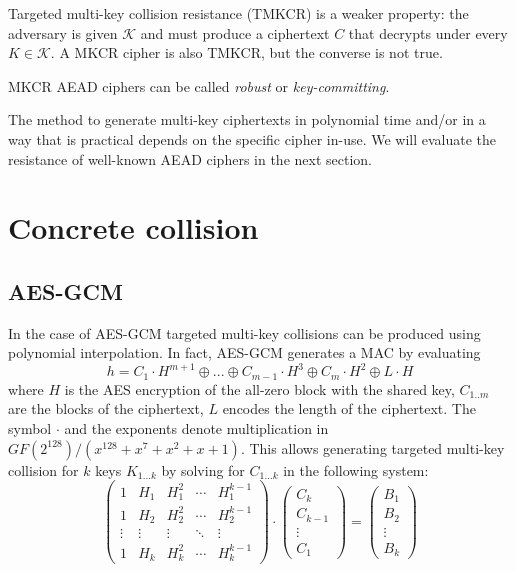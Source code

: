 \documentclass[9pt, a4paper]{article}
\begin{document}
Targeted multi-key collision resistance (TMKCR) is a weaker property: the adversary is given $\mathcal K$ and must produce a ciphertext $C$ that decrypts under every $K \in \mathcal K$.
A MKCR cipher is also TMKCR, but the converse is not true.

MKCR AEAD ciphers can be called \emph{robust} or \emph{key-committing}.

The method to generate multi-key ciphertexts in polynomial time
and/or in a way that is practical
depends on the specific cipher in-use.
We will evaluate the resistance of well-known AEAD ciphers
in the next section.


\section{Concrete collision}
\subsection{AES-GCM}
In the case of AES-GCM
targeted multi-key collisions can be produced using polynomial interpolation.
In fact, AES-GCM generates a MAC by evaluating
\begin{equation}
	h =
	C_1 \cdot H^{m+1}
	\oplus
	...
	\oplus
	C_{m-1} \cdot H^3
	\oplus
	C_m \cdot H^2
	\oplus
	L \cdot H
	\label{auth}
\end{equation}
where
$H$ is the AES encryption of the all-zero block with the shared key,
$C_{1..m}$ are the blocks of the ciphertext,
$L$ encodes the length of the ciphertext.
The symbol $\cdot$ and the exponents denote multiplication in $GF(2^{128})/(x^{128} + x^7 + x^2 +x +1)$.
This allows generating targeted multi-key collision for $k$ keys $K_{1...k}$ by solving for $C_{1...k}$ in the following system:
\begin{equation}
\begin{pmatrix}
	1 & H_1 & H_1^2 & \cdots & H_1^{k-1}
	\\
	1 & H_2 & H_2^2 & \cdots & H_2^{k-1}
	\\
	\vdots & \vdots & \vdots & \ddots & \vdots
	\\
	1 & H_k & H_k^2 & \cdots & H_k^{k-1}
\end{pmatrix}
\cdot
\begin{pmatrix}
	C_k
	\\
	C_{k-1}
	\\
	\vdots
	\\
	C_1
\end{pmatrix}
=
\begin{pmatrix}
	B_1
	\\
	B_2
	\\
	\vdots
	\\
	B_k
\end{pmatrix}
\end{equation}
\end{document}
